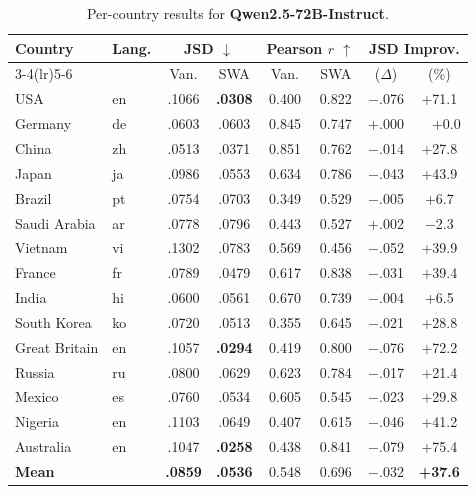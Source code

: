 \documentclass{article}
\newcommand{\gain}[1]{\textcolor{improvegreen}{#1}}
\newcommand{\loss}[1]{\textcolor{worsered}{#1}}
\begin{document}
\begin{table}[h]
\caption{Per-country results for \textbf{Qwen2.5-72B-Instruct}.}
\label{tab:percountry_qwen72b_app}
\centering\setlength{\tabcolsep}{3.5pt}\footnotesize
\begin{tabular}{llcccccc}
\toprule
Country & Lang. & \multicolumn{2}{c}{JSD $\downarrow$} & \multicolumn{2}{c}{Pearson $r$ $\uparrow$} & \multicolumn{2}{c}{JSD Improv.} \\
\cmidrule(lr){3-4}\cmidrule(lr){5-6}
 & & Van. & SWA & Van. & SWA & ($\Delta$) & (\%) \\
\midrule
USA          & en & .1066 & \textbf{.0308} & 0.400 & 0.822 & $-$.076 & \gain{+71.1} \\
Germany      & de & .0603 & .0603          & 0.845 & 0.747 & +.000   & ~~+0.0 \\
China        & zh & .0513 & .0371          & 0.851 & 0.762 & $-$.014 & \gain{+27.8} \\
Japan        & ja & .0986 & .0553          & 0.634 & 0.786 & $-$.043 & \gain{+43.9} \\
Brazil       & pt & .0754 & .0703          & 0.349 & 0.529 & $-$.005 & \gain{+6.7}  \\
Saudi Arabia & ar & .0778 & .0796          & 0.443 & 0.527 & +.002   & \loss{$-$2.3}\\
Vietnam      & vi & .1302 & .0783          & 0.569 & 0.456 & $-$.052 & \gain{+39.9} \\
France       & fr & .0789 & .0479          & 0.617 & 0.838 & $-$.031 & \gain{+39.4} \\
India        & hi & .0600 & .0561          & 0.670 & 0.739 & $-$.004 & \gain{+6.5}  \\
South Korea  & ko & .0720 & .0513          & 0.355 & 0.645 & $-$.021 & \gain{+28.8} \\
Great Britain& en & .1057 & \textbf{.0294} & 0.419 & 0.800 & $-$.076 & \gain{+72.2} \\
Russia       & ru & .0800 & .0629          & 0.623 & 0.784 & $-$.017 & \gain{+21.4} \\
Mexico       & es & .0760 & .0534          & 0.605 & 0.545 & $-$.023 & \gain{+29.8} \\
Nigeria      & en & .1103 & .0649          & 0.407 & 0.615 & $-$.046 & \gain{+41.2} \\
Australia    & en & .1047 & \textbf{.0258} & 0.438 & 0.841 & $-$.079 & \gain{+75.4} \\
\midrule
\textbf{Mean} & & \textbf{.0859} & \textbf{.0536} & 0.548 & 0.696 & $-$.032 & \gain{\textbf{+37.6}} \\
\bottomrule
\end{tabular}
\end{table}
\end{document}
